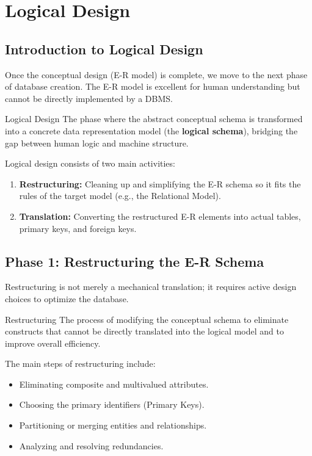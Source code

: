 



\section{Logical Design}

\subsection{Introduction to Logical Design}

Once the conceptual design (E-R model) is complete, we move to the next phase of database creation. The E-R model is excellent for human understanding but cannot be directly implemented by a DBMS. 

\begin{defbox}{Logical Design}
The phase where the abstract conceptual schema is transformed into a concrete data representation model (the \textbf{logical schema}), bridging the gap between human logic and machine structure.
\end{defbox}

Logical design consists of two main activities:
\begin{enumerate}
    \item \textbf{Restructuring:} Cleaning up and simplifying the E-R schema so it fits the rules of the target model (e.g., the Relational Model).
    \item \textbf{Translation:} Converting the restructured E-R elements into actual tables, primary keys, and foreign keys.
\end{enumerate}

\subsection{Phase 1: Restructuring the E-R Schema}
Restructuring is not merely a mechanical translation; it requires active design choices to optimize the database.

\begin{defbox}{Restructuring}
The process of modifying the conceptual schema to eliminate constructs that cannot be directly translated into the logical model and to improve overall efficiency.
\end{defbox}

The main steps of restructuring include:
\begin{itemize}
    \item Eliminating composite and multivalued attributes.
    \item Choosing the primary identifiers (Primary Keys).
    \item Partitioning or merging entities and relationships.
    \item Analyzing and resolving redundancies.
\end{itemize}

